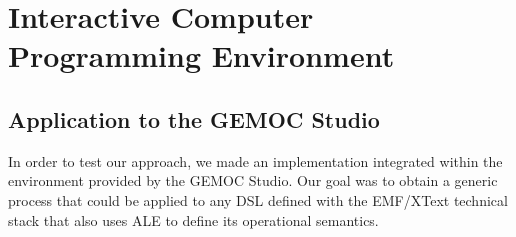 \section{Interactive Computer Programming Environment}

\subsection{Application to the GEMOC Studio}


In order to test our approach, we made an implementation integrated within the environment provided by the GEMOC Studio.
Our goal was to obtain a generic process that could be applied to any DSL defined with the EMF/XText technical stack that also uses ALE to define its operational semantics.

